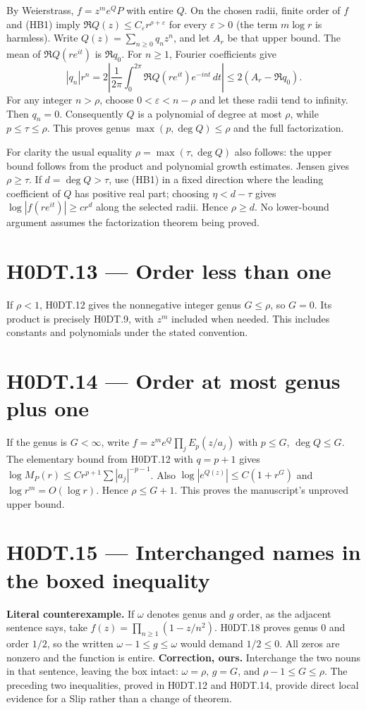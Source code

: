 By Weierstrass, $f=z^m e^Q P$ with entire $Q$. On the chosen radii, finite order of $f$ and (HB1) imply
$\Re Q(z)\le C_\varepsilon r^{\rho+\varepsilon}$ for every $\varepsilon>0$ (the term $m\log r$ is harmless). Write $Q(z)=\sum_{n\ge0}q_nz^n$, and let $A_r$ be that upper bound. The mean of $\Re Q(re^{it})$ is $\Re q_0$. For $n\ge1$, Fourier coefficients give
\[
 |q_n|r^n=2\left|\frac1{2\pi}\int_0^{2\pi}\Re Q(re^{it})e^{-int}\,dt\right|
 \le2(A_r-\Re q_0).
\]
For any integer $n>\rho$, choose $0<\varepsilon<n-\rho$ and let these radii tend to infinity. Then $q_n=0$. Consequently $Q$ is a polynomial of degree at most $\rho$, while $p\le\tau\le\rho$. This proves genus $\max(p,\deg Q)\le\rho$ and the full factorization.

For clarity the usual equality $\rho=\max(\tau,\deg Q)$ also follows: the upper bound follows from the product and polynomial growth estimates. Jensen gives $\rho\ge\tau$. If $d=\deg Q>\tau$, use (HB1) in a fixed direction where the leading coefficient of $Q$ has positive real part; choosing $\eta<d-\tau$ gives $\log|f(re^{it})|\ge c r^d$ along the selected radii. Hence $\rho\ge d$. No lower-bound argument assumes the factorization theorem being proved.

\section*{H0DT.13 --- Order less than one}
If $\rho<1$, H0DT.12 gives the nonnegative integer genus $G\le\rho$, so $G=0$. Its product is precisely H0DT.9, with $z^m$ included when needed. This includes constants and polynomials under the stated convention.

\section*{H0DT.14 --- Order at most genus plus one}
If the genus is $G<\infty$, write $f=z^m e^Q\prod_jE_p(z/a_j)$ with $p\le G$, $\deg Q\le G$. The elementary bound from H0DT.12 with $q=p+1$ gives $\log M_P(r)\le C r^{p+1}\sum|a_j|^{-p-1}$. Also $\log|e^{Q(z)}|\le C(1+r^G)$ and $\log r^m=O(\log r)$. Hence $\rho\le G+1$. This proves the manuscript's unproved upper bound.

\section*{H0DT.15 --- Interchanged names in the boxed inequality}
\textbf{Literal counterexample.} If $\omega$ denotes genus and $g$ order, as the adjacent sentence says, take $f(z)=\prod_{n\ge1}(1-z/n^2)$. H0DT.18 proves genus $0$ and order $1/2$, so the written $\omega-1\le g\le\omega$ would demand $1/2\le0$. All zeros are nonzero and the function is entire. \textbf{Correction, ours.} Interchange the two nouns in that sentence, leaving the box intact: $\omega=\rho$, $g=G$, and $\rho-1\le G\le\rho$. The preceding two inequalities, proved in H0DT.12 and H0DT.14, provide direct local evidence for a Slip rather than a change of theorem.

